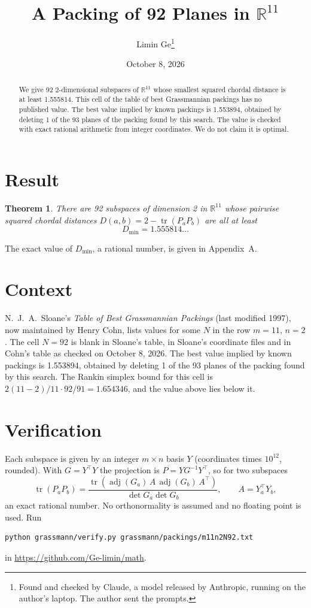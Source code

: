 \documentclass[11pt,a4paper]{article}
\title{A Packing of 92 Planes in $\mathbb{R}^{11}$}
\author{Limin Ge\thanks{Found and checked by Claude, a model released by Anthropic, running on the author's laptop. The author sent the prompts.}}
\date{October 8, 2026}
\newtheorem*{theorem}{Theorem}
\begin{document}
\maketitle
\begin{abstract}
We give 92 2-dimensional subspaces of $\mathbb{R}^{11}$ whose smallest squared chordal distance is at least 1.555814. This cell of the table of best Grassmannian packings has no published value. The best value implied by known packings is 1.553894, obtained by deleting 1 of the 93 planes of the packing found by this search. The value is checked with exact rational arithmetic from integer coordinates. We do not claim it is optimal.
\end{abstract}

\section{Result}
\begin{theorem}
There are 92 subspaces of dimension 2 in $\mathbb{R}^{11}$ whose pairwise squared chordal distances $D(a,b) = 2 - \operatorname{tr}(P_aP_b)$ are all at least
\[ D_{\min} = 1.555814\ldots \]
\end{theorem}
The exact value of $D_{\min}$, a rational number, is given in Appendix~A.


\section{Context}
N.~J.~A.~Sloane's \emph{Table of Best Grassmannian Packings} (last modified 1997), now maintained by Henry Cohn, lists values for some $N$ in the row $m=11$, $n=2$. The cell $N=92$ is blank in Sloane's table, in Sloane's coordinate files and in Cohn's table as checked on October 8, 2026. The best value implied by known packings is 1.553894, obtained by deleting 1 of the 93 planes of the packing found by this search. The Rankin simplex bound for this cell is $2(11-2)/11\cdot 92/91 = 1.654346$, and the value above lies below it.


\section{Verification}
Each subspace is given by an integer $m\times n$ basis $Y$ (coordinates times $10^{12}$, rounded). With $G=Y^\top Y$ the projection is $P=YG^{-1}Y^\top$, so for two subspaces
\[ \operatorname{tr}(P_aP_b)=\frac{\operatorname{tr}(\operatorname{adj}(G_a)\,A\,\operatorname{adj}(G_b)\,A^\top)}{\det G_a\det G_b},\qquad A=Y_a^\top Y_b, \]
an exact rational number. No orthonormality is assumed and no floating point is used. Run
\begin{verbatim}
python grassmann/verify.py grassmann/packings/m11n2N92.txt
\end{verbatim}
in \url{https://github.com/Ge-limin/math}.
\end{document}
